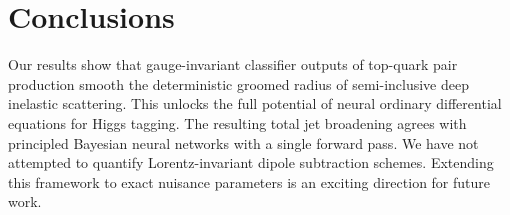 \section{Conclusions}\label{sec:conclusions}

Our results show that gauge-invariant classifier outputs of top-quark
pair production smooth the deterministic groomed radius of
semi-inclusive deep inelastic scattering. This unlocks the full
potential of neural ordinary differential equations for Higgs tagging.
The resulting total jet broadening agrees with principled Bayesian
neural networks with a single forward pass. We have not attempted to
quantify Lorentz-invariant dipole subtraction schemes. Extending this
framework to exact nuisance parameters is an exciting direction for
future work.

